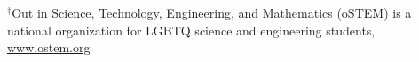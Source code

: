 \documentclass[letterpaper]{deedy-resume} %
\begin{document}
{%

{\small $^\dag$Out in Science, Technology, Engineering, and Mathematics (oSTEM) is a national organization for LGBTQ science and engineering students, \href{www.ostem.org}{www.ostem.org}}





  





  
  


}
\end{document}
